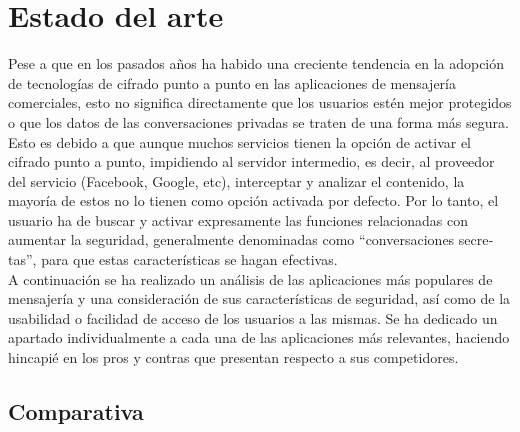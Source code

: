 \chapter{Estado del arte}

Pese a que en los pasados años ha habido una creciente tendencia en la adopción de tecnologías de cifrado punto a punto en las aplicaciones de mensajería comerciales, esto no significa directamente que los usuarios estén mejor protegidos o que los datos de las conversaciones privadas se traten de una forma más segura. \\

Esto es debido a que aunque muchos servicios tienen la opción de activar el cifrado punto a punto, impidiendo al servidor intermedio, es decir, al proveedor del servicio (Facebook, Google, etc), interceptar y analizar el contenido, la mayoría de estos no lo tienen como opción activada por defecto. Por lo tanto, el usuario ha de buscar y activar expresamente las funciones relacionadas con aumentar la seguridad, generalmente  denominadas como \hyphenquote{spanish}{conversaciones secretas}, para que estas características se hagan efectivas. \\

A continuación se ha realizado un análisis de las aplicaciones más populares de mensajería y una consideración de sus características de seguridad, así como de la usabilidad o facilidad de acceso de los usuarios a las mismas. Se ha dedicado un apartado individualmente a cada una de las aplicaciones más relevantes, haciendo hincapié en los pros y contras que presentan respecto a sus competidores. \cite{Ermoshina2016} \cite{Scorecard} \cite{AppComparison01} \cite{AppComparison02}  \cite{AppsWithEncryption} \\ 

\pagebreak

\section {Comparativa}

